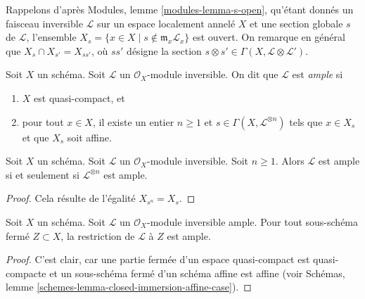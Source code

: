 \noindent
Rappelons d'après Modules, lemme \ref{modules-lemma-s-open},
qu'étant donnés un faisceau inversible $\mathcal{L}$ sur un espace localement
annelé $X$ et une section globale $s$ de $\mathcal{L}$,
l'ensemble $X_s = \{x \in X \mid s \not \in \mathfrak m_x\mathcal{L}_x\}$
est ouvert. On remarque en général que
$X_s \cap X_{s'} = X_{ss'}$, où $ss'$ désigne
la section $s \otimes s' \in \Gamma(X, \mathcal{L} \otimes \mathcal{L}')$.

\begin{definition}
\label{definition-ample}
\begin{reference}
\cite[II Definition 4.5.3]{EGA}
\end{reference}
Soit $X$ un schéma.
Soit $\mathcal{L}$ un $\mathcal{O}_X$-module
inversible. On dit que $\mathcal{L}$ est {\it ample} si
\begin{enumerate}
\item $X$ est quasi-compact, et
\item pour tout $x \in X$, il existe un entier $n \geq 1$
et $s \in \Gamma(X, \mathcal{L}^{\otimes n})$ tels
que $x \in X_s$ et que $X_s$ soit affine.
\end{enumerate}
\end{definition}

\begin{lemma}
\label{lemma-ample-power-ample}
\begin{reference}
\cite[II Proposition 4.5.6(i)]{EGA}
\end{reference}
Soit $X$ un schéma. Soit $\mathcal{L}$ un $\mathcal{O}_X$-module
inversible. Soit $n \geq 1$. Alors $\mathcal{L}$ est ample si et seulement si
$\mathcal{L}^{\otimes n}$ est ample.
\end{lemma}

\begin{proof}
Cela résulte de l'égalité $X_{s^n} = X_s$.
\end{proof}

\begin{lemma}
\label{lemma-ample-on-closed}
Soit $X$ un schéma.
Soit $\mathcal{L}$ un $\mathcal{O}_X$-module
inversible ample. Pour tout sous-schéma fermé $Z \subset X$, la restriction de
$\mathcal{L}$ à $Z$ est ample.
\end{lemma}

\begin{proof}
C'est clair, car une partie fermée d'un espace quasi-compact est quasi-compacte
et un sous-schéma fermé d'un schéma affine est affine (voir
Schémas, lemme \ref{schemes-lemma-closed-immersion-affine-case}).
\end{proof}

